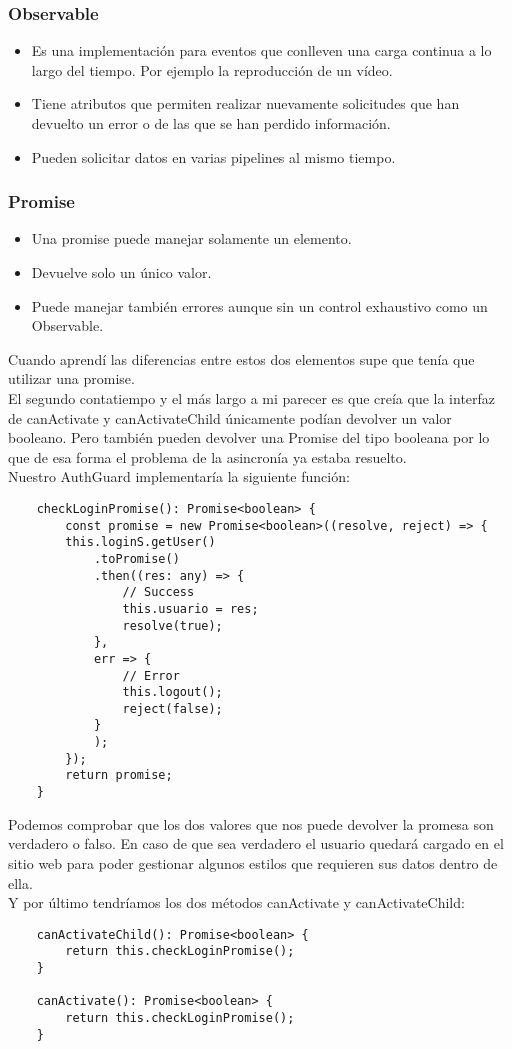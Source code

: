 \subsubsection{Observable}
\begin{itemize}
    \item Es una implementación para eventos que conlleven una carga continua a lo largo del tiempo. Por ejemplo la reproducción de un vídeo.
    \item Tiene atributos que permiten realizar nuevamente solicitudes que han devuelto un error o de las que se han perdido información.
    \item Pueden solicitar datos en varias pipelines al mismo tiempo.
\end{itemize}

\subsubsection{Promise}
\begin{itemize}
    \item Una promise puede manejar solamente un elemento.
    \item Devuelve solo un único valor.
    \item Puede manejar también errores aunque sin un control exhaustivo como un Observable.
\end{itemize}

Cuando aprendí las diferencias entre estos dos elementos supe que tenía que utilizar una promise.
\\El segundo contatiempo y el más largo a mi parecer es que creía que la interfaz de canActivate y canActivateChild únicamente podían devolver un valor booleano. Pero también pueden devolver una Promise del tipo booleana por lo que de esa forma el problema de la asincronía ya estaba resuelto.
\\Nuestro AuthGuard implementaría la siguiente función:
\begin{verbatim}
    checkLoginPromise(): Promise<boolean> {
        const promise = new Promise<boolean>((resolve, reject) => {
        this.loginS.getUser()
            .toPromise()
            .then((res: any) => {
                // Success
                this.usuario = res;
                resolve(true);
            },
            err => {
                // Error
                this.logout();
                reject(false);
            }
            );
        });
        return promise;
    }
\end{verbatim}
Podemos comprobar que los dos valores que nos puede devolver la promesa son verdadero o falso. En caso de que sea verdadero el usuario quedará cargado en el sitio web para poder gestionar algunos estilos que requieren sus datos dentro de ella.
\\Y por último tendríamos los dos métodos canActivate y canActivateChild:
\begin{verbatim}
    canActivateChild(): Promise<boolean> {
        return this.checkLoginPromise();
    }

    canActivate(): Promise<boolean> {
        return this.checkLoginPromise();
    }
\end{verbatim}



